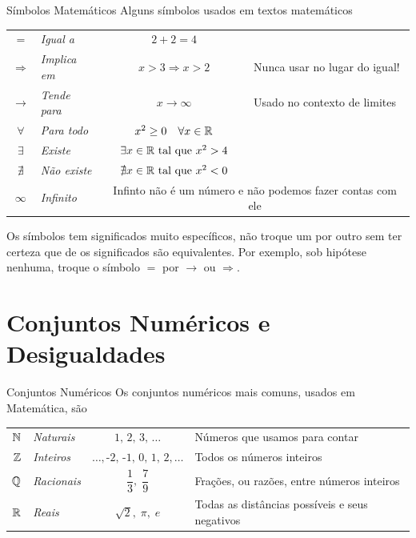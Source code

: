 \begin{teoria}{Símbolos Matemáticos}
    Alguns símbolos usados em textos matemáticos 
    \begin{center}
        \begin{tabular}{clcl} \hline
            $=$            & \emph{Igual a}    & $2+2=4$               &                               \\
            $\Rightarrow$  & \emph{Implica em} & $x>3 \Rightarrow x>2$ & Nunca usar no lugar do igual! \\
            $\rightarrow$  & \emph{Tende para} & $x\to\infty$          & Usado no contexto de limites  \\
            $\forall$      & \emph{Para todo}  & $x^2 \geq 0 \quad \forall x\in\mathbb{R}$ & \\
            $\exists$      & \emph{Existe}     & $\exists  x \in\mathbb{R} \text{ tal que } x^2 > 4$ & \\
            $\nexists$     & \emph{Não existe} & $\quad\nexists x \in\mathbb{R} \text{ tal que } x^2 < 0\quad$ & \\
            $\infty$       & \emph{Infinito}   & \multicolumn{2}{c}{Infinto não é um número e não podemos fazer contas com ele} \\ \hline
        \end{tabular}
    \end{center}
    
    Os símbolos tem significados muito específicos, não troque um por outro sem ter certeza que de os significados são equivalentes. 
    Por exemplo, sob hipótese nenhuma, troque o símbolo $=$ por $\to$ ou $\Rightarrow$. 

\end{teoria}

\section{Conjuntos Numéricos e Desigualdades}

\begin{teoria}{Conjuntos Numéricos}
    Os conjuntos numéricos mais comuns, usados em Matemática, são  \\
    \begin{tabular}{clcl}
        $\mathbb{N}$ & \emph{Naturais}  &               $1,\,2,\,3,\,\dots$               & Números que usamos para contar                 \\
        $\mathbb{Z}$ & \emph{Inteiros}  & $\dots,\text{-}2,\,\text{-}1,\,0,\,1,\,2,\dots$ & Todos os números inteiros                      \\
        $\mathbb{Q}$ & \emph{Racionais} &         $\dfrac{1}{3},\; \dfrac{7}{9}$          & Frações, ou razões, entre números inteiros     \\
        $\mathbb{R}$ & \emph{Reais}     &              $\sqrt{2},\;\pi,\;e $              & Todas as distâncias possíveis e seus negativos
    \end{tabular}
\end{teoria}    

